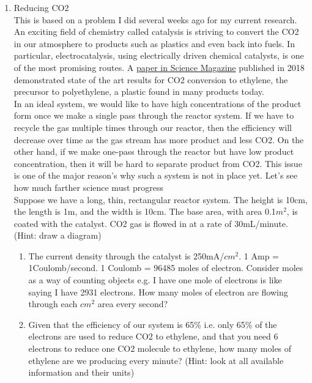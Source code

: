 \documentclass{article}
\begin{document}
\begin{enumerate}
\begin{enumerate}
\begin{enumerate}
        \end{enumerate}
    \end{enumerate}
    \item Reducing CO2\\
    This is based on a problem I did several weeks ago for my current research.\\
    \newline
    An exciting field of chemistry called catalysis is striving to convert the CO2 in our atmosphere to products such as plastics and even back into fuels. In particular, electrocatalysis, using electrically driven chemical catalysts, is one of the most promising routes. A \href{https://docs.google.com/viewer?url=http\%3A\%2F\%2Fwww.light.utoronto.ca\%2Fedit\%2Ffiles\%2F2018_-_science_-_co2_electroreduction_to_ethylene_via_hydroxide-mediated_copper_catalysts_at_an_abrupt_interface.pdf}{paper in Science Magazine} published in 2018 demonstrated state of the art results for CO2 conversion to ethylene, the precursor to polyethylene, a plastic found in many products today.\\ 
    In an ideal system, we would like to have high concentrations of the product form once we make a single pass through the reactor system. If we have to recycle the gas multiple times through our reactor, then the efficiency will decrease over time as the gas stream has more product and less CO2. On the other hand, if we make one-pass through the reactor but have low product concentration, then it will be hard to separate product from CO2. This issue is one of the major reason's why such a system is not in place yet. Let's see how much farther science must progress\\
    Suppose we have a long, thin, rectangular reactor system. The height is 10cm, the length is 1m, and the width is 10cm. The base area, with area 0.1$m^2$, is coated with the catalyst. CO2 gas is flowed in at a rate of 30mL/minute.(Hint: draw a diagram)\\
    \begin{enumerate}
        \item The current density through the catalyst is 250mA/$cm^2$. 1 Amp = 1Coulomb/second. 1 Coulomb = 96485 moles of electron. Consider moles as a way of counting objects e.g. I have one mole of electrons is like saying I have 2931 electrons. How many moles of electron are flowing through each $cm^2$ area every second?
        \item Given that the efficiency of our system is 65\% i.e. only 65\% of the electrons are used to reduce CO2 to ethylene, and that you need 6 electrons to reduce one CO2 molecule to ethylene, how many moles of ethylene are we producing every minute? (Hint: look at all available information and their units)

\end{enumerate}
\end{enumerate}
\end{document}
